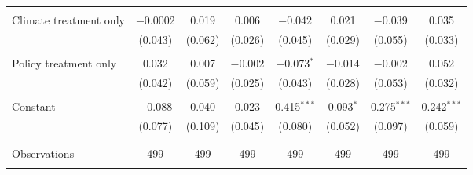 \begin{tabular}{@{\extracolsep{5pt}}lccccccc}
  & & & & & & & \\ 
 Climate treatment only & $-$0.0002 & 0.019 & 0.006 & $-$0.042 & 0.021 & $-$0.039 & 0.035 \\ 
  & (0.043) & (0.062) & (0.026) & (0.045) & (0.029) & (0.055) & (0.033) \\ 
  & & & & & & & \\ 
 Policy treatment only & 0.032 & 0.007 & $-$0.002 & $-$0.073$^{*}$ & $-$0.014 & $-$0.002 & 0.052 \\ 
  & (0.042) & (0.059) & (0.025) & (0.043) & (0.028) & (0.053) & (0.032) \\ 
  & & & & & & & \\ 
 Constant & $-$0.088 & 0.040 & 0.023 & 0.415$^{***}$ & 0.093$^{*}$ & 0.275$^{***}$ & 0.242$^{***}$ \\ 
  & (0.077) & (0.109) & (0.045) & (0.080) & (0.052) & (0.097) & (0.059) \\ 
  & & & & & & & \\ 
\hline \\[-1.8ex] 

Observations & 499 & 499 & 499 & 499 & 499 & 499 & 499 \\ 
\hline 
\hline \\[-1.8ex] 
\end{tabular} 